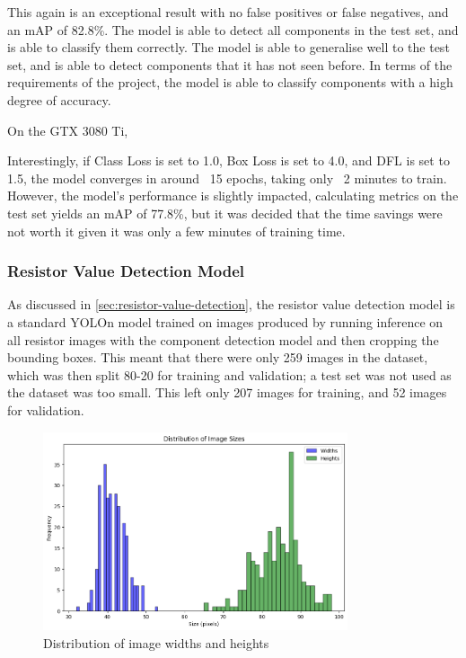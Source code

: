 This again is an exceptional result with no false positives or false negatives, and an mAP of 82.8\%. The model is able to detect all components in the test set, and is able to classify them correctly. The model is able to generalise well to the test set, and is able to detect components that it has not seen before. In terms of the requirements of the project, the model is able to classify components with a high degree of accuracy.

  
  
On the GTX 3080 Ti, 
  
Interestingly, if Class Loss is set to 1.0, Box Loss is set to 4.0, and DFL is set to 1.5, the model converges in around ~15 epochs, taking only ~2 minutes to train. However, the model's performance is slightly impacted, calculating metrics on the test set yields an mAP of 77.8\%, but it was decided that the time savings were not worth it given it was only a few minutes of training time.


\subsubsection{Resistor Value Detection Model}
As discussed in \autoref{sec:resistor-value-detection}, the resistor value detection model is a standard YOLOn model trained on images produced by running inference on all resistor images with the component detection model and then cropping the bounding boxes. This meant that there were only 259 images in the dataset, which was then split 80-20 for training and validation; a test set was not used as the dataset was too small. This left only 207 images for training, and 52 images for validation.

\begin{figure}[H]
  \centering
  \includegraphics[width=0.8\textwidth]{imgs/graphs/pixel_distrib.png}
  \caption{Distribution of image widths and heights}
  \label{fig:pixel-distrib}
\end{figure}


